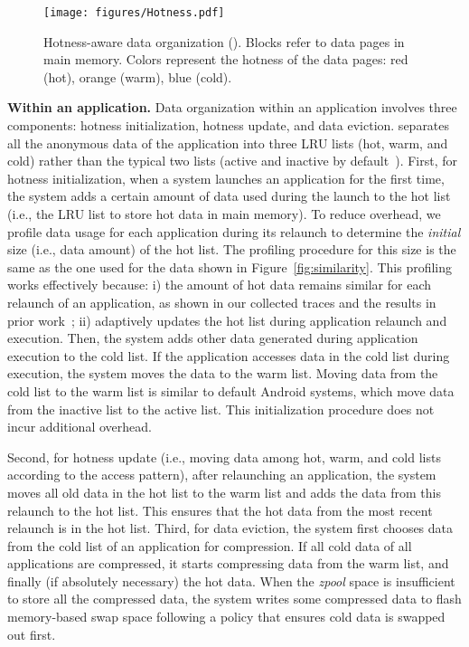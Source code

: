 \begin{figure}[!h]
\centering
\texttt{[image: figures/Hotness.pdf]}
\caption{Hotness-aware data organization (\dataorg). Blocks refer to data pages in main memory. Colors represent the hotness of the data
pages:  red (hot), orange (warm), blue (cold).}
\label{fig:dataorg}
\end{figure}

\noindent\textbf{Within an application.}  Data organization within an application involves three components: hotness initialization, hotness update, and data eviction. \dataorg separates all the anonymous data of the application into three LRU lists (hot, warm, and cold) rather than the typical two lists (active and inactive by default~\cite{Linuxkernel, LRUactive}).
First, for hotness initialization,  when a system launches an application for the first time, the system adds a certain amount of data used during the launch to the hot list (i.e., the LRU list to store hot data in main memory). To reduce overhead,  we profile data usage for each application during its relaunch to determine the \emph{initial} size (i.e., data amount) of the hot list. The profiling procedure for this size is the same as the one used for the data shown in Figure~\ref{fig:similarity}. This profiling works effectively because: i) the amount of hot data remains similar for each relaunch of an application, as shown in our collected traces and the results in prior work~\cite{son2021asap}; ii) \proposal adaptively updates the hot list during application relaunch and execution. 
Then, the system adds other data generated during application execution to the cold list. If the application accesses data in the cold list during execution, the system moves the data to the warm list. Moving data from the cold list to the warm list is similar to default Android systems, which move data from the inactive list to the active list.  This initialization procedure does not incur additional overhead.


Second, for hotness update (i.e., moving data among hot, warm, and cold lists according to the access pattern), after relaunching an application, the system moves all old data in the hot list to the warm list and adds the data from this relaunch to the hot list. This ensures that the hot data from the most recent relaunch is in the hot list.
Third, for data eviction, the system first chooses data from the cold list of an application for compression. If all cold data of all applications are compressed, it starts compressing data from the warm list, and finally (if absolutely necessary) the hot data. When the  \emph{zpool} space is insufficient to store all the compressed data, the system writes some compressed data to flash memory-based swap space following a policy that ensures cold data is swapped out first.


